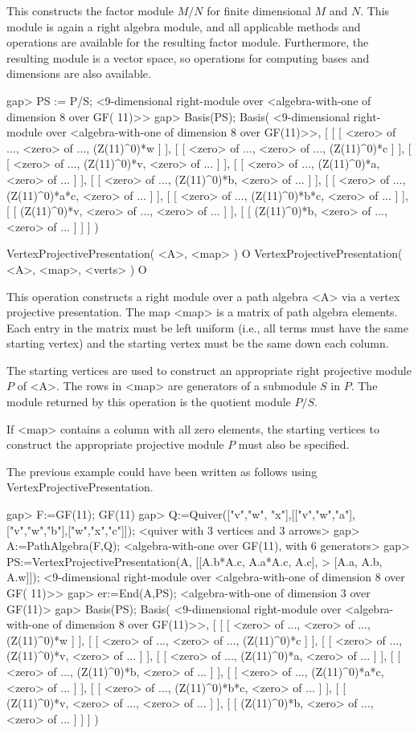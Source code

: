 This constructs the factor module $M/N$
for finite dimensional $M$ and $N$.
This module is again a right algebra module,
and all applicable methods and operations
are available for the resulting factor module.
Furthermore,
the resulting module is
a vector space,
so operations for computing bases
and dimensions are also available.

\beginexample
gap> PS := P/S;
<9-dimensional right-module over <algebra-with-one of dimension 8 over GF(
11)>>
gap> Basis(PS);
Basis( <9-dimensional right-module over <algebra-with-one of dimension 
8 over GF(11)>>, [ [ [ <zero> of ..., <zero> of ..., (Z(11)^0)*w ] ], 
  [ [ <zero> of ..., <zero> of ..., (Z(11)^0)*c ] ], 
  [ [ <zero> of ..., (Z(11)^0)*v, <zero> of ... ] ], 
  [ [ <zero> of ..., (Z(11)^0)*a, <zero> of ... ] ], 
  [ [ <zero> of ..., (Z(11)^0)*b, <zero> of ... ] ], 
  [ [ <zero> of ..., (Z(11)^0)*a*c, <zero> of ... ] ], 
  [ [ <zero> of ..., (Z(11)^0)*b*c, <zero> of ... ] ], 
  [ [ (Z(11)^0)*v, <zero> of ..., <zero> of ... ] ], 
  [ [ (Z(11)^0)*b, <zero> of ..., <zero> of ... ] ] ] )
\endexample

\>VertexProjectivePresentation( <A>, <map> ) O
\>VertexProjectivePresentation( <A>, <map>, <verts> ) O

This operation constructs a right module
over a path algebra <A>
via a vertex projective presentation.
The map <map>
is a matrix
of path algebra elements.
Each entry
in the matrix must be left uniform
(i.e., all terms must have the same starting vertex)
and the starting vertex must be the same down each
column.

The starting vertices are used
to construct an appropriate right projective module $P$
of <A>. The rows in <map> are generators
of a submodule $S$ in $P$.
The module returned by this operation
is the quotient module $P/S$.

If <map> contains a column
with all zero elements,
the starting vertices
to construct the appropriate
projective module $P$ must also be specified.

The previous example could have been written as follows
using VertexProjectivePresentation.

\beginexample
gap> F:=GF(11);
GF(11)
gap> Q:=Quiver(["v","w", "x"],[["v","w","a"],["v","w","b"],["w","x","c"]]);
<quiver with 3 vertices and 3 arrows>
gap> A:=PathAlgebra(F,Q);
<algebra-with-one over GF(11), with 6 generators>
gap> PS:=VertexProjectivePresentation(A, [[A.b*A.c, A.a*A.c, A.c],
> [A.a, A.b, A.w]]);
<9-dimensional right-module over <algebra-with-one of dimension 8 over GF(
11)>>
gap> er:=End(A,PS);
<algebra-with-one of dimension 3 over GF(11)>
gap> Basis(PS);
Basis( <9-dimensional right-module over <algebra-with-one of dimension 
8 over GF(11)>>, [ [ [ <zero> of ..., <zero> of ..., (Z(11)^0)*w ] ], 
  [ [ <zero> of ..., <zero> of ..., (Z(11)^0)*c ] ], 
  [ [ <zero> of ..., (Z(11)^0)*v, <zero> of ... ] ], 
  [ [ <zero> of ..., (Z(11)^0)*a, <zero> of ... ] ], 
  [ [ <zero> of ..., (Z(11)^0)*b, <zero> of ... ] ], 
  [ [ <zero> of ..., (Z(11)^0)*a*c, <zero> of ... ] ], 
  [ [ <zero> of ..., (Z(11)^0)*b*c, <zero> of ... ] ], 
  [ [ (Z(11)^0)*v, <zero> of ..., <zero> of ... ] ], 
  [ [ (Z(11)^0)*b, <zero> of ..., <zero> of ... ] ] ] )
\endexample

